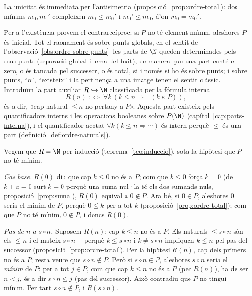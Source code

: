 \begin{prova}
La unicitat és immediata per l'antisimetria
(proposició~\ref{prop:ordre-total}): dos mínims \(m_0,m_0'\) compleixen
\(m_0\le m_0'\) i \(m_0'\le m_0\), d'on \(m_0=m_0'\).

Per a l'existència provem el contrarecíproc: si \(P\) no té element mínim,
aleshores \(P\) és inicial. Tot el raonament és sobre punts globals, en el
sentit de l'observació~\ref{obs:ordre-sobre-punts}: les parts de \(\N\)
queden determinades pels seus punts (separació global i lema del buit),
de manera que una part conté el zero, o és tancada pel successor, o és
total, si i només si ho és sobre punts; i sobre punts, \enquote{o},
\enquote{existeix} i la pertinença a una imatge tenen el sentit clàssic.
Introduïm la part auxiliar
\(R\hookrightarrow\N\) classificada per la fórmula interna
\[
R(n)\ :\Longleftrightarrow\ \forall k\ (k\le n\Rightarrow \neg(k\mathrel{\varepsilon}P)),
\]
és a dir, «cap natural \(\le n\) no pertany a \(P\)». Aquesta part existeix
pels quantificadors interns i les operacions booleanes sobre \(P(\N)\)
(capítol~\ref{cap:parts-interna}), i el quantificador acotat \(\forall
k(k\le n\Rightarrow\cdots)\) és intern perquè \(\le\) és una part
(definició~\ref{def:ordre-naturals}).

Vegem que \(R=\N\) per inducció (teorema~\ref{teo:induccio}), sota la
hipòtesi que \(P\) no té mínim.

\emph{Cas base.} \(R(0)\) diu que cap \(k\le0\) no és a \(P\); com que
\(k\le0\) força \(k=0\) (de \(k+a=0\) surt \(k=0\) perquè una suma nul·la té els
dos sumands nuls, proposició~\ref{prop:suma}), \(R(0)\) equival a \(0\notin P\). Ara
bé, si \(0\in P\), aleshores \(0\) seria el mínim de \(P\), perquè \(0\le
k\) per a tot \(k\) (proposició~\ref{prop:ordre-total}); com que \(P\) no
té mínim, \(0\notin P\), i doncs \(R(0)\).

\emph{Pas de \(n\) a \(s\circ n\).} Suposem \(R(n)\): cap \(k\le n\) no és
a \(P\). Els naturals \(\le s\circ n\) són els \(\le n\) i el mateix
\(s\circ n\) ---perquè \(k\le s\circ n\) i \(k\ne s\circ n\) impliquen
\(k\le n\) pel pas del successor (proposició~\ref{prop:ordre-total}). Per
la hipòtesi \(R(n)\), cap dels primers no és a \(P\); resta veure que
\(s\circ n\notin P\). Però si \(s\circ n\in P\), aleshores \(s\circ n\)
seria el \emph{mínim} de \(P\): per a tot \(j\in P\), com que cap \(k\le
n\) no és a \(P\) (per \(R(n)\)), ha de ser \(n<j\), és a dir \(s\circ
n\le j\) (pas del successor). Això contradiu que \(P\) no tingui mínim.
Per tant \(s\circ n\notin P\), i \(R(s\circ n)\).


\end{prova}
